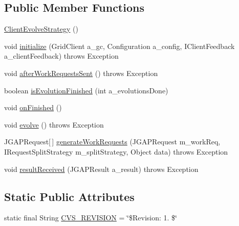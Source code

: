 \subsection*{Public Member Functions}
\begin{DoxyCompactItemize}
\item 
\hyperlink{classexamples_1_1grid_1_1fitness_distributed_1_1_client_evolve_strategy_a9ff44774bab591094bf29e7de42cd877}{Client\-Evolve\-Strategy} ()
\item 
void \hyperlink{classexamples_1_1grid_1_1fitness_distributed_1_1_client_evolve_strategy_a7821818153d45fdd3f44661c65fe165a}{initialize} (Grid\-Client a\-\_\-gc, Configuration a\-\_\-config, I\-Client\-Feedback a\-\_\-client\-Feedback)  throws Exception 
\item 
void \hyperlink{classexamples_1_1grid_1_1fitness_distributed_1_1_client_evolve_strategy_a24c4adbb97ab9fdab3bedd117bc4aa32}{after\-Work\-Requests\-Sent} ()  throws Exception 
\item 
boolean \hyperlink{classexamples_1_1grid_1_1fitness_distributed_1_1_client_evolve_strategy_a9408472eecd367346c323d11adcd7393}{is\-Evolution\-Finished} (int a\-\_\-evolutions\-Done)
\item 
void \hyperlink{classexamples_1_1grid_1_1fitness_distributed_1_1_client_evolve_strategy_ac908aac515d3bae2d6b1f201d2b93a3c}{on\-Finished} ()
\item 
void \hyperlink{classexamples_1_1grid_1_1fitness_distributed_1_1_client_evolve_strategy_ad4fdba9a574a7ffcdaaef9df7d8a41e5}{evolve} ()  throws Exception 
\item 
J\-G\-A\-P\-Request\mbox{[}$\,$\mbox{]} \hyperlink{classexamples_1_1grid_1_1fitness_distributed_1_1_client_evolve_strategy_add1d3c9743ec44a5929ffe39cf237960}{generate\-Work\-Requests} (J\-G\-A\-P\-Request m\-\_\-work\-Req, I\-Request\-Split\-Strategy m\-\_\-split\-Strategy, Object data)  throws Exception 
\item 
void \hyperlink{classexamples_1_1grid_1_1fitness_distributed_1_1_client_evolve_strategy_a068302207f44050958ec7057bbc57771}{result\-Received} (J\-G\-A\-P\-Result a\-\_\-result)  throws Exception 
\end{DoxyCompactItemize}
\subsection*{Static Public Attributes}
\begin{DoxyCompactItemize}
\item 
static final String \hyperlink{classexamples_1_1grid_1_1fitness_distributed_1_1_client_evolve_strategy_ad66b843778b4280bc65527d80e4a6ae2}{C\-V\-S\-\_\-\-R\-E\-V\-I\-S\-I\-O\-N} = \char`\"{}\$Revision\-: 1. \$\char`\"{}
\end{DoxyCompactItemize}
